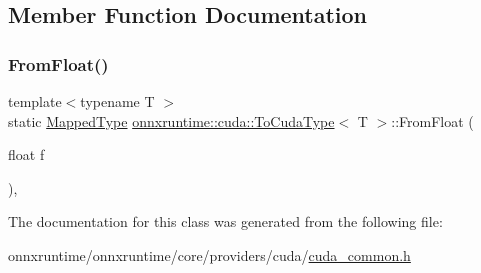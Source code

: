 \subsection{Member Function Documentation}
\mbox{\label{classonnxruntime_1_1cuda_1_1ToCudaType_aca884727366d2b420efe93bb0ed80752}} 
\subsubsection{\texorpdfstring{From\+Float()}{FromFloat()}}
{\footnotesize\ttfamily template$<$typename T $>$ \\
static \mbox{\hyperlink{classonnxruntime_1_1cuda_1_1ToCudaType_a22769ed832bbccc67be1e6ed760598c6}{Mapped\+Type}} \mbox{\hyperlink{classonnxruntime_1_1cuda_1_1ToCudaType}{onnxruntime\+::cuda\+::\+To\+Cuda\+Type}}$<$ T $>$\+::From\+Float (\begin{DoxyParamCaption}\item[{float}]{f }\end{DoxyParamCaption})\hspace{0.3cm}{\ttfamily [inline]}, {\ttfamily [static]}}



The documentation for this class was generated from the following file\+:\begin{DoxyCompactItemize}
\item 
onnxruntime/onnxruntime/core/providers/cuda/\mbox{\hyperlink{cuda__common_8h}{cuda\+\_\+common.\+h}}\end{DoxyCompactItemize}
